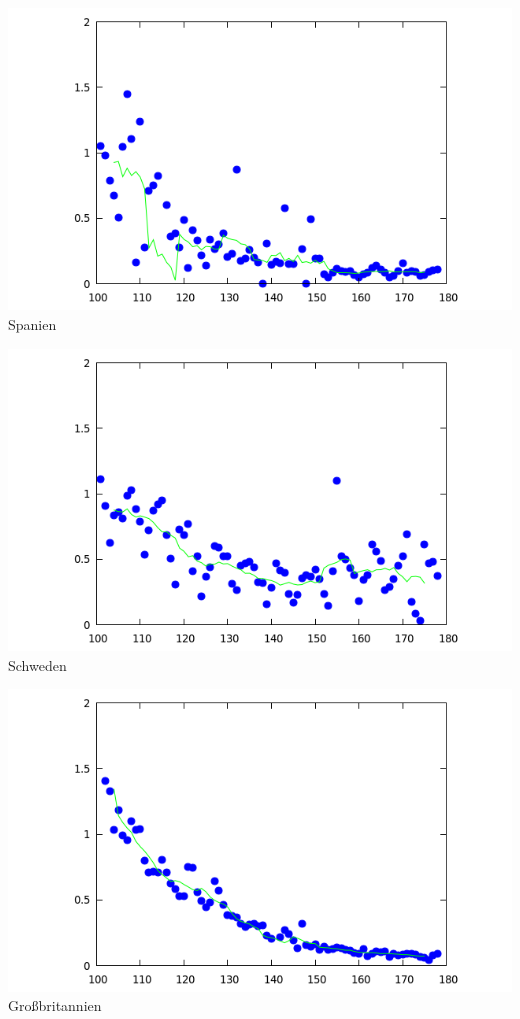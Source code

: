 \documentclass[a4paper,11pt]{article}
\begin{document}
\begin{center}
  \begin{minipage}{.3\textwidth}\centering
    \includegraphics[width=\textwidth]{Spain-R.png}\\[1em] {Spanien}
  \end{minipage}\hfill
  \begin{minipage}{.3\textwidth}\centering
    \includegraphics[width=\textwidth]{Sweden-R.png}\\[1em] {Schweden}
  \end{minipage}\hfill
  \begin{minipage}{.3\textwidth}\centering
    \includegraphics[width=\textwidth]{UK-R.png}\\[1em] {Großbritannien}
  \end{minipage}
\end{center}
\end{document}
